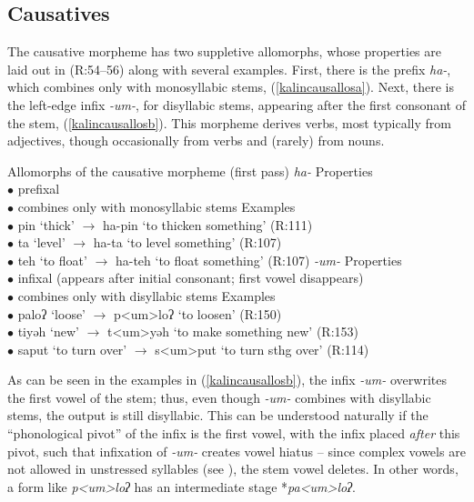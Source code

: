 \documentclass[output=paper]{langscibook}
\begin{document}
\subsection{Causatives}\label{sec:kalin:3.1}

The causative morpheme has two suppletive allomorphs, whose properties are laid out in \Next (R:54--56) along with several examples. First, there is the prefix  \textit{ha-}, which combines only with monosyllabic stems, (\ref{kalincausallosa}). Next, there is the left-edge infix \textit{-um-}, for disyllabic stems, appearing after the first consonant of the stem, (\ref{kalincausallosb}). This morpheme derives verbs, most typically from adjectives, though occasionally from verbs and (rarely) from nouns.

\ea Allomorphs of the causative morpheme (first pass) \label{kalincausallos}
\ea \textit{ha-}\label{kalincausallosa}
\ea  Properties\\
$\bullet$ prefixal\\
$\bullet$ combines only with monosyllabic stems
\ex Examples\\
$\bullet$ pin `thick' $\rightarrow$ ha-pin `to thicken something' \hfill (R:111)\\
$\bullet$ ta `level' $\rightarrow$ ha-ta `to level something' \hfill (R:107)\\
$\bullet$ teh `to float' $\rightarrow$ ha-teh `to float something' \hfill (R:107)
\z
\ex \textit{-um-} \label{kalincausallosb}
\ea Properties\\
$\bullet$ infixal (appears after initial consonant; first vowel disappears)\\
$\bullet$ combines only with disyllabic stems
\ex Examples\\
$\bullet$ paloʔ `loose' $\rightarrow$ p<um>loʔ `to loosen' \hfill (R:150)\\
$\bullet$ tiyəh `new' $\rightarrow$ t<um>yəh `to make something new' \hfill (R:153)\\
$\bullet$ saput `to turn over' $\rightarrow$ s<um>put `to turn sthg over' \hfill (R:114)
\z
\z
\z

As can be seen in the examples in (\ref{kalincausallosb}), the infix \textit{-um-} overwrites the first vowel of the stem; thus, even though \textit{-um-} combines with disyllabic stems, the output is still disyllabic. This can be understood naturally if the ``phonological pivot'' \citep{Yu07} of the infix is the first vowel, with the infix placed \textit{after} this pivot, such that infixation of \textit{-um-} creates vowel hiatus -- since complex vowels are not allowed in unstressed syllables (see ), the stem vowel deletes. In other words, a form like \textit{p<um>loʔ} has an intermediate stage *\textit{pa<um>loʔ}.
\end{document}
